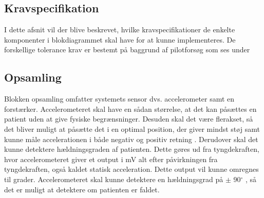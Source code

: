 \subsection{Kravspecifikation}
I dette afsnit vil der blive beskrevet, hvilke kravspecifikationer de enkelte komponenter i blokdiagrammet skal have for at kunne implementeres. De forskellige tolerance krav er bestemt på baggrund af pilotforsøg som ses under 

\subsection{Opsamling}
Blokken opsamling omfatter systemets sensor dvs. accelerometer samt en forstærker. Accelerometeret skal have en sådan størrelse, at det kan påsættes en patient uden at give fysiske begrænsninger. Desuden skal det være flerakset, så det bliver muligt at påsætte det i en optimal position, der giver mindst støj samt kunne måle accelerationen i både negativ og positiv retning . Derudover skal det kunne detektere hældningsgraden af patienten. Dette gøres ud fra tyngdekraften, hvor accelerometeret giver et output i mV alt efter påvirkningen fra tyngdekraften, også kaldet statisk acceleration. Dette output vil kunne omregnes til grader. Accelerometeret skal kunne detektere en hældningsgrad på $\pm$ 90$^{\circ}$ , så det er muligt at detektere om patienten er faldet. \\
